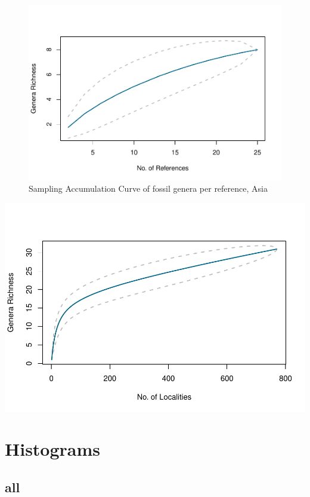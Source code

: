 \documentclass[]{article}
\begin{document}
\begin{figure}[htbp]
\centering
\includegraphics{MA_JJ_files/figure-latex/SACGAsia-1.pdf}
\caption{Sampling Accumulation Curve of fossil genera per reference,
Asia}
\end{figure}

\includegraphics{MA_JJ_files/figure-latex/SAC fossil occurences-1.pdf}

\newpage

\section{Histograms}\label{histograms}

\subsection{all}\label{all}
\end{document}
